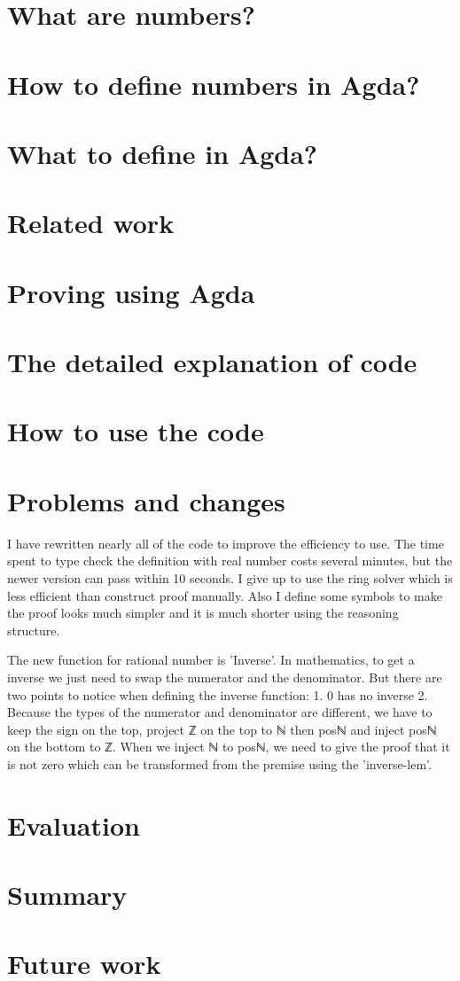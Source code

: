 \documentclass{article}
\begin{document}
\section{What are numbers?}


\section{How to define numbers in Agda?}


\section{What to define in Agda?}



\section{Related work}


\section{Proving using Agda}

\section{The detailed explanation of code}

\section{How to use the code}

\section{Problems and changes}

I have rewritten nearly all of the code to improve the efficiency to use. The time spent to type check
the definition with real number costs several minutes, but the newer version can pass within 10 seconds.
I give up to use the ring solver which is less efficient than construct proof manually.
Also I define some symbols to make the proof looks much simpler and it is much shorter using the reasoning structure.


The new function for rational number is 'Inverse'. In mathematics, to get a inverse we just need to swap the numerator and the denominator. But there are two points to notice when defining the inverse function:
1. 0 has no inverse
2. Because the types of the numerator and denominator are different, we have to keep the sign on the top, project ℤ on the top to ℕ then posℕ and inject posℕ on the bottom to ℤ. When we inject ℕ to posℕ, we need to give the proof that it is not zero which can be transformed from the premise using the 'inverse-lem'.

\section{Evaluation}

\section{Summary}

\section{Future work}
\end{document}
